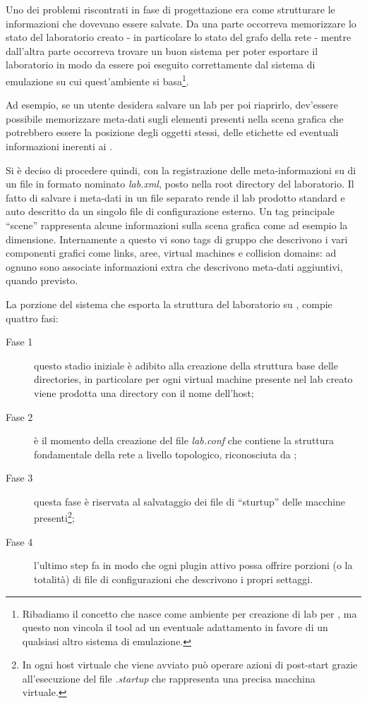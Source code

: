 Uno dei problemi riscontrati in fase di progettazione era come strutturare le informazioni che dovevano essere salvate. Da una parte occorreva memorizzare lo stato del laboratorio creato - in particolare lo stato del grafo della rete - mentre dall'altra parte occorreva trovare un buon sistema per poter esportare il laboratorio in modo da essere poi eseguito correttamente dal sistema di emulazione su cui quest'ambiente si basa\footnote{Ribadiamo il concetto che \visualnetkit{} nasce come ambiente per creazione di lab per \netkit{}, ma questo non vincola il tool ad un eventuale adattamento in favore di un qualsiasi altro sistema di emulazione.}.

Ad esempio, se un utente desidera salvare un lab per poi riaprirlo, dev'essere possibile memorizzare meta-dati sugli elementi presenti nella scena grafica che potrebbero essere la posizione degli oggetti stessi, delle etichette ed eventuali informazioni inerenti ai \plugin{}.

Si è deciso di procedere quindi, con la registrazione delle meta-informazioni su di un file in formato \xml{} nominato \emph{lab.xml}, posto nella root directory del laboratorio.
Il fatto di salvare i meta-dati in un file separato rende il lab prodotto standard e auto descritto da un singolo file di configurazione esterno.
Un tag principale ``scene'' rappresenta alcune informazioni sulla scena grafica come ad esempio la dimensione. Internamente a questo vi sono tags di gruppo che descrivono i vari componenti grafici come links, aree, virtual machines e collision domains: ad ognuno sono associate informazioni extra che descrivono meta-dati aggiuntivi, quando previsto.

La porzione del sistema che esporta la struttura del laboratorio su \fs{}, compie quattro fasi:
\begin{description}
\item[Fase 1] questo stadio iniziale è adibito alla creazione della struttura base delle directories, in particolare per ogni virtual machine presente nel lab creato viene prodotta una directory con il nome dell'host;
\item[Fase 2] è il momento della creazione del file \emph{lab.conf} che contiene la struttura fondamentale della rete a livello topologico, riconosciuta da \netkit{};
\item[Fase 3] questa fase è riservata al salvataggio dei file di ``sturtup'' delle macchine presenti\footnote{In \netkit{} ogni host virtuale che viene avviato può operare azioni di post-start grazie all'esecuzione del file \emph{.startup} che rappresenta una precisa macchina virtuale.};
\item[Fase 4] l'ultimo step fa in modo che ogni plugin attivo possa offrire porzioni (o la totalità) di file di configurazioni che descrivono i propri settaggi.
\end{description}

